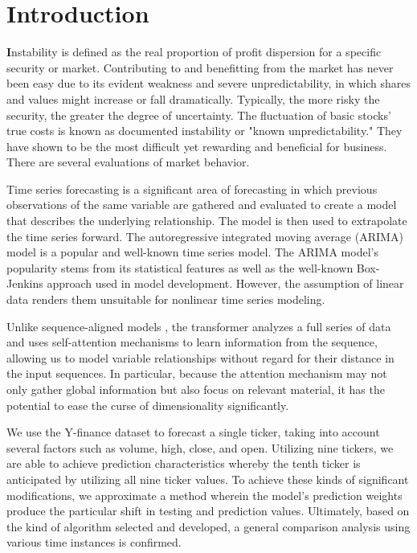 \chapter{Introduction}
\label{ch:into} %

\textbf 

Instability is defined as the real proportion of profit dispersion for a specific security or market. Contributing to and benefitting from the market has never been easy due to its evident weakness and severe unpredictability, in which shares and values might increase or fall dramatically. Typically, the more risky the security, the greater the degree of uncertainty. The fluctuation of basic stocks' true costs is known as documented instability or "known unpredictability." They have shown to be the most difficult yet rewarding and beneficial for business. There are several evaluations of market behavior.

Time series forecasting is a significant area of forecasting in which previous observations of the same variable are gathered and evaluated to create a model that describes the underlying relationship. The model is then used to extrapolate the time series forward. The autoregressive integrated moving average (ARIMA) model is a popular and well-known time series model. The ARIMA model's popularity stems from its statistical features as well as the well-known Box-Jenkins approach \citep{DEGROOT1991177} used in model development. However, the assumption of linear data renders them unsuitable for nonlinear time series modeling.

Unlike sequence-aligned models \citep{wu2020deep}, the transformer analyzes a full series of data and uses self-attention mechanisms to learn information from the sequence, allowing us to model variable relationships without regard for their distance in the input sequences. In particular, because the attention mechanism may not only gather global information but also focus on relevant material, it has the potential to ease the curse of dimensionality significantly.


We use the Y-finance dataset to forecast a single ticker, taking into account several factors 
such as volume, high, close, and open. Utilizing nine tickers, we are able to achieve 
prediction characteristics whereby the tenth ticker is anticipated by utilizing all nine ticker 
values. To achieve these kinds of significant modifications, we approximate a method wherein 
the model's prediction weights produce the particular shift in testing and prediction values. 
Ultimately, based on the kind of algorithm selected and developed, a general comparison 
analysis using various time instances is confirmed. 

